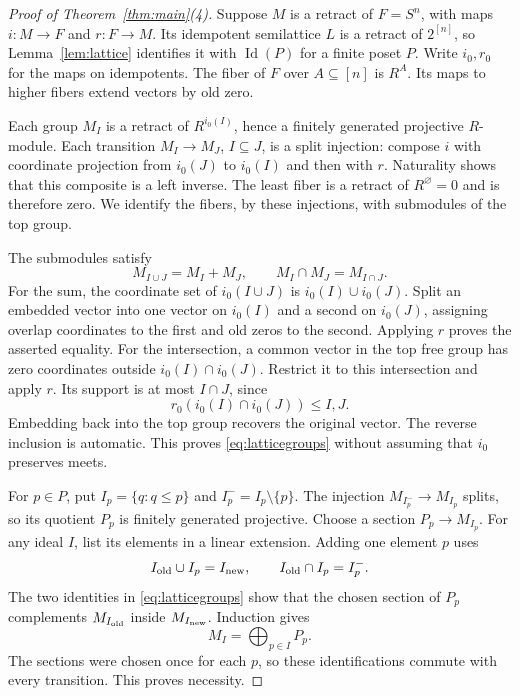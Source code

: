 \documentclass[11pt]{amsart}
\DeclareMathOperator{\Id}{Id}
\theoremstyle{definition}
\theoremstyle{remark}
\begin{document}
\begin{proof}[Proof of Theorem~\ref{thm:main}(4)]
Suppose $M$ is a retract of $F=S^n$, with maps $i:M\to F$ and $r:F\to M$. Its idempotent semilattice $L$ is a retract of $2^{[n]}$, so Lemma~\ref{lem:lattice} identifies it with $\Id(P)$ for a finite poset $P$. Write $i_0,r_0$ for the maps on idempotents. The fiber of $F$ over $A\subseteq[n]$ is $R^A$. Its maps to higher fibers extend vectors by old zero.

Each group $M_I$ is a retract of $R^{i_0(I)}$, hence a finitely generated projective $R$-module. Each transition $M_I\to M_J$, $I\subseteq J$, is a split injection: compose $i$ with coordinate projection from $i_0(J)$ to $i_0(I)$ and then with $r$. Naturality shows that this composite is a left inverse. The least fiber is a retract of $R^{\varnothing}=0$ and is therefore zero. We identify the fibers, by these injections, with submodules of the top group.

The submodules satisfy
\begin{equation}\label{eq:latticegroups}
 M_{I\cup J}=M_I+M_J,\qquad M_I\cap M_J=M_{I\cap J}.
\end{equation}
For the sum, the coordinate set of $i_0(I\cup J)$ is $i_0(I)\cup i_0(J)$. Split an embedded vector into one vector on $i_0(I)$ and a second on $i_0(J)$, assigning overlap coordinates to the first and old zeros to the second. Applying $r$ proves the asserted equality. For the intersection, a common vector in the top free group has zero coordinates outside $i_0(I)\cap i_0(J)$. Restrict it to this intersection and apply $r$. Its support is at most $I\cap J$, since
\[
 r_0(i_0(I)\cap i_0(J))\le I,J.
\]
Embedding back into the top group recovers the original vector. The reverse inclusion is automatic. This proves \eqref{eq:latticegroups} without assuming that $i_0$ preserves meets.

For $p\in P$, put $I_p=\{q:q\le p\}$ and $I_p^-=I_p\setminus\{p\}$. The injection $M_{I_p^-}\to M_{I_p}$ splits, so its quotient $P_p$ is finitely generated projective. Choose a section $P_p\to M_{I_p}$. For any ideal $I$, list its elements in a linear extension. Adding one element $p$ uses
\[
 I_{\rm old}\cup I_p=I_{\rm new},\qquad I_{\rm old}\cap I_p=I_p^-.
\]
The two identities in \eqref{eq:latticegroups} show that the chosen section of $P_p$ complements $M_{I_{\rm old}}$ inside $M_{I_{\rm new}}$. Induction gives
\[
 M_I=\bigoplus_{p\in I}P_p.
\]
The sections were chosen once for each $p$, so these identifications commute with every transition. This proves necessity.


\end{proof}
\end{document}
